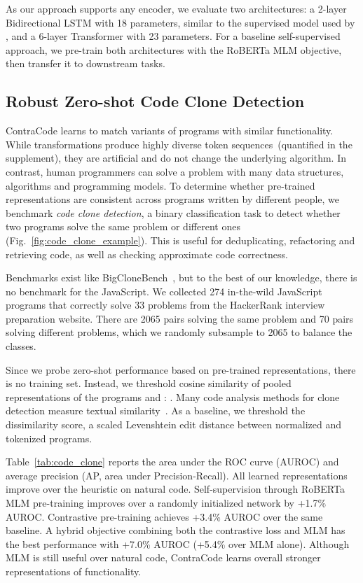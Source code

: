 \documentclass[11pt]{article}
\newcommand{\thou}[0]{}
\newcommand{\million}[0]{}
\newcommand{\ours}[0]{ContraCode}
\begin{document}
As our approach supports any encoder, we evaluate two architectures: a 2-layer Bidirectional LSTM with 18\million{} parameters, similar to the supervised model used by \citet{hellendoorn2018deep}, and a 6-layer Transformer with 23\million{} parameters.
For a baseline self-supervised approach, we pre-train both architectures with the RoBERTa MLM objective, then transfer it to downstream tasks.

\subsection{Robust Zero-shot Code Clone Detection}
\label{sec:experiments_code_clone}

\ours{} learns to match variants of programs with similar functionality. While transformations produce highly diverse token sequences~(quantified in the supplement), they are artificial and do not change the underlying algorithm. In contrast, human programmers can solve a problem with many data structures, algorithms and programming models. To determine whether pre-trained representations are consistent across programs written by different people, we benchmark \textit{code clone detection}, a binary classification task to detect whether two programs solve the same problem or different ones (Fig.~\ref{fig:code_clone_example}). This is useful for deduplicating, refactoring and retrieving code, as well as checking approximate code correctness.

Benchmarks exist like BigCloneBench~\citep{10.1109/ICSME.2014.77}, but to the best of our knowledge, there is no benchmark for the JavaScript. We collected 274 in-the-wild JavaScript programs that correctly solve 33 problems from the HackerRank interview preparation website. 
There are 2065 pairs solving the same problem and 70\thou{} pairs solving different problems, which we randomly subsample to 2065 to balance the classes.

Since we probe zero-shot performance based on pre-trained representations, there is no training set. Instead, we threshold cosine similarity of pooled representations of the programs  and : .
Many code analysis methods for clone detection measure textual similarity~\cite{Baker92aprogram}. As a baseline, we threshold the dissimilarity score, a scaled Levenshtein edit distance between normalized and tokenized programs.

Table~\ref{tab:code_clone} reports the area under the ROC curve (AUROC) and average precision (AP, area under Precision-Recall). All learned representations improve over the heuristic on natural code. Self-supervision through RoBERTa MLM pre-training improves over a randomly initialized network by +1.7\% AUROC. Contrastive pre-training achieves +3.4\% AUROC over the same baseline. A hybrid objective combining both the contrastive loss and MLM has the best performance with +7.0\% AUROC (+5.4\% over MLM alone). Although MLM is still useful over natural code, \ours{} learns overall stronger representations of functionality.
\end{document}
